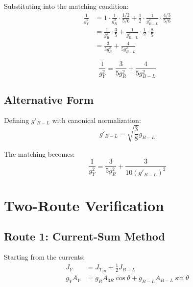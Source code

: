 \documentclass[11pt,a4paper]{article}
\begin{document}
Substituting into the matching condition:
\begin{align}
\label{eq:matching-step1}
\frac{1}{g_Y^2} &= 1 \cdot \frac{1}{g_R^2} \cdot \frac{1/2}{5/6}
+ \frac{1}{2} \cdot \frac{1}{g_{B-L}^2} \cdot \frac{4/3}{5/6} \\
\label{eq:matching-step2}
&= \frac{1}{g_R^2} \cdot \frac{3}{5} + \frac{1}{g_{B-L}^2} \cdot \frac{1}{2} \cdot \frac{8}{5} \\
\label{eq:matching-step3}
&= \frac{3}{5 g_R^2} + \frac{4}{5 g_{B-L}^2}
\end{align}

\begin{equation}
\label{eq:matching-final}
\boxed{\frac{1}{g_Y^2} = \frac{3}{5 g_R^2} + \frac{4}{5 g_{B-L}^2}}
\end{equation}

\subsection{Alternative Form}
\label{subsec:alternative-form}

Defining $g'_{B-L}$ with canonical normalization:
\begin{equation}
\label{eq:canonical-g-bl}
g'_{B-L} = \sqrt{\frac{3}{8}} g_{B-L}
\end{equation}

The matching becomes:
\begin{equation}
\label{eq:matching-canonical}
\frac{1}{g_Y^2} = \frac{3}{5 g_R^2} + \frac{3}{10 (g'_{B-L})^2}
\end{equation}

\section{Two-Route Verification}
\label{sec:two-route}

\subsection{Route 1: Current-Sum Method}
\label{subsec:route1}

Starting from the currents:
\begin{align}
\label{eq:route1-step1}
J_Y &= J_{T_{3R}} + \frac{1}{2} J_{B-L} \\
\label{eq:route1-step2}
g_Y A_Y &= g_R A_{3R} \cos\theta + g_{B-L} A_{B-L} \sin\theta
\end{align}
\end{document}
